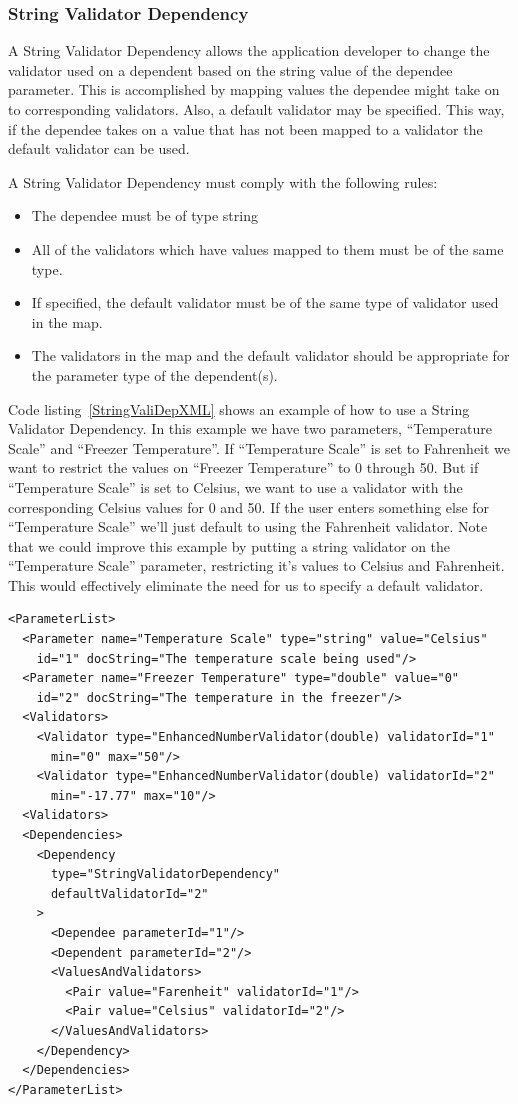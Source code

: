 \subsubsection{String Validator Dependency}
A String Validator Dependency allows the application developer to change the validator used on a dependent based on the string value of the dependee
parameter. This is accomplished by mapping values the dependee might take on to corresponding validators. Also, a default validator may be specified.
This way, if the dependee takes on a value that has not been mapped to a validator the default validator can be used. 

A String Validator Dependency must comply with the following rules:
\begin{itemize}
\item The dependee must be of type string
\item All of the validators which have values mapped to them must be of the same type.
\item If specified, the default validator must be of the same type of validator used in the map.
\item The validators in the map and the default validator should be appropriate for the parameter type of the dependent(s).
\end{itemize}

Code listing~\ref{StringValiDepXML} shows an example of how to use a String Validator Dependency. In this example we have two parameters, ``Temperature Scale''
and ``Freezer Temperature''. If ``Temperature Scale'' is set to Fahrenheit we want to restrict the values on ``Freezer Temperature'' to 0 through 50. But
if ``Temperature Scale'' is set to Celsius, we want to use a validator with the corresponding Celsius values for 0 and 50. If the user enters something else
for ``Temperature Scale'' we'll just default to using the Fahrenheit validator.  Note that we could improve this example by putting a string validator on 
the ``Temperature Scale'' parameter, restricting it's values to Celsius and Fahrenheit.  This would effectively eliminate the need for us to specify a default 
validator.
\begin{lstlisting}[caption={Example usage of a String Validator Dependency}, label=StringValiDepXML]
<ParameterList>
  <Parameter name="Temperature Scale" type="string" value="Celsius"
    id="1" docString="The temperature scale being used"/>
  <Parameter name="Freezer Temperature" type="double" value="0"
    id="2" docString="The temperature in the freezer"/>
  <Validators>
    <Validator type="EnhancedNumberValidator(double) validatorId="1"
      min="0" max="50"/>
    <Validator type="EnhancedNumberValidator(double) validatorId="2"
      min="-17.77" max="10"/>
  <Validators>
  <Dependencies>
    <Dependency 
      type="StringValidatorDependency" 
      defaultValidatorId="2"
    >
      <Dependee parameterId="1"/>
      <Dependent parameterId="2"/>
      <ValuesAndValidators>
        <Pair value="Farenheit" validatorId="1"/>
        <Pair value="Celsius" validatorId="2"/>
      </ValuesAndValidators>
    </Dependency>
  </Dependencies>
</ParameterList>
\end{lstlisting}

